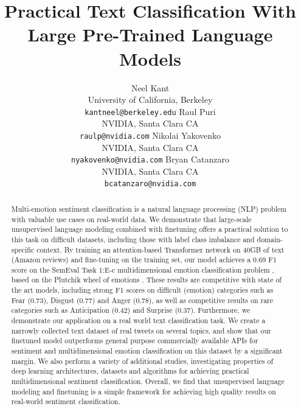 \documentclass[letterpaper]{article} %
\begin{document}
\title{Practical Text Classification With Large Pre-Trained Language Models}
\author{
Neel Kant\\
University of California, Berkeley\\
\texttt{kantneel@berkeley.edu}
\And
Raul Puri\\
NVIDIA, Santa Clara CA\\
\texttt{raulp@nvidia.com}
\And
Nikolai Yakovenko\\
NVIDIA, Santa Clara CA\\
\texttt{nyakovenko@nvidia.com}
\And
Bryan Catanzaro\\
NVIDIA, Santa Clara CA\\
\texttt{bcatanzaro@nvidia.com}
}
\maketitle

\begin{abstract}
Multi-emotion sentiment classification is a natural language processing (NLP) problem with valuable use cases on real-world data. We demonstrate that large-scale unsupervised language modeling combined with finetuning offers a practical solution to this task on difficult datasets, including those with label class imbalance and domain-specific context. By training an attention-based Transformer network \protect\cite{Transformer2017} on 40GB of text (Amazon reviews) \protect\cite{McAuley2015} and fine-tuning on the training set, our model achieves a 0.69 F1 score on the SemEval Task 1:E-c multidimensional emotion classification problem \protect\cite{SemEval2018Task1}, based on the Plutchik wheel of emotions \protect\cite{Plutchik1979}. These results are competitive with state of the art models, including strong F1 scores on difficult (emotion) categories such as Fear (0.73), Disgust (0.77) and Anger (0.78), as well as competitive results on rare categories such as Anticipation (0.42) and Surprise (0.37). Furthermore, we demonstrate our application on a
real world text classification task. We create a narrowly collected text dataset of real tweets on several topics, and show that our finetuned model outperforms general purpose commercially available APIs for sentiment and multidimensional emotion classification on this dataset by a significant margin.
We also perform a variety of additional studies, investigating properties of deep learning architectures, datasets and algorithms for achieving practical multidimensional sentiment classification. Overall, we find that unsupervised language modeling and finetuning is a simple framework for achieving high quality results on real-world sentiment classification.

\end{abstract}
\end{document}
